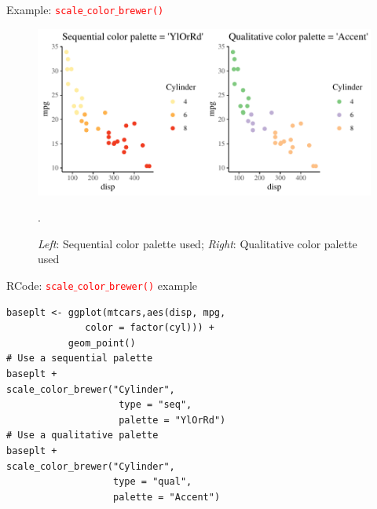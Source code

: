 \documentclass{beamer}
\begin{document}
\begin{frame}{Example: \texttt{\textcolor{red}{scale$\_$color$\_$brewer()}}}
\begin{figure}
\includegraphics[width=0.99\linewidth]{PlotsLec3/ColorBrewer}
\caption{\small{\textit{Left}: Sequential color palette used; \textit{Right}: Qualitative color palette used}}.
\end{figure}
\end{frame}

\begin{frame}[fragile]{RCode: \texttt{\textcolor{red}{scale$\_$color$\_$brewer()}} example}
\begin{lstlisting}
baseplt <- ggplot(mtcars,aes(disp, mpg, 
              color = factor(cyl))) +
           geom_point()
# Use a sequential palette
baseplt +
scale_color_brewer("Cylinder", 
                    type = "seq", 
                    palette = "YlOrRd")
# Use a qualitative palette
baseplt +
scale_color_brewer("Cylinder", 
                   type = "qual", 
                   palette = "Accent")
\end{lstlisting}
\end{frame}
\end{document}
